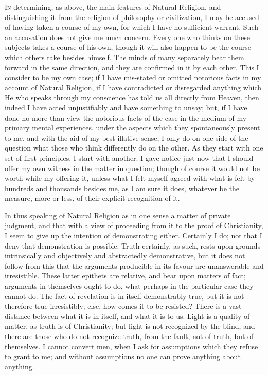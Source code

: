 I\textsc{n} determining, as above, the main features of Natural
Religion, and distinguishing it from the religion of philosophy or
civilization, I may be accused of having taken a course of my own, for
which I have no sufficient warrant. Such an accusation does not give
me much concern. Every one who thinks on these subjects takes a course
of his own, though it will also happen to be the course which others
take besides himself. The minds of many separately bear them forward
in the same direction, and they are confirmed in it by each other.
This I consider to be my own case; if I have mis-stated or omitted
notorious facts in my account of Natural Religion, if I have
contradicted or disregarded anything which He who speaks through my
conscience has told us all directly from Heaven, then indeed I have
acted unjustifiably and have something to unsay; but, if I have done
no more than view the notorious facts of the case in the medium of my
primary mental experiences, under the aspects which they spontaneously
present to me, and with the aid of my best illative sense, I only do
on one side of the question what those who think differently do on the
other. As they start with one set of first principles, I start
with another. I gave notice just now that I should offer my own
witness in the matter in question; though of course it would not be
worth while my offering it, unless what I felt myself agreed with what
is felt by hundreds and thousands besides me, as I am sure it does,
whatever be the measure, more or less, of their explicit recognition
of it.

In thus speaking of Natural Religion as in one sense a matter of
private judgment, and that with a view of proceeding from it to the
proof of Christianity, I seem to give up the intention of
demonstrating either. Certainly I do; not that I deny that
demonstration is possible. Truth certainly, as such, rests upon
grounds intrinsically and objectively and abstractedly demonstrative,
but it does not follow from this that the arguments producible in its
favour are unanswerable and irresistible. These latter epithets are
relative, and bear upon matters of fact; arguments in themselves ought
to do, what perhaps in the particular case they cannot do. The fact of
revelation is in itself demonstrably true, but it is not therefore
true irresistibly; else, how comes it to be resisted? There is a vast
distance between what it is in itself, and what it is to us. Light is
a quality of matter, as truth is of Christianity; but light is not
recognized by the blind, and there are those who do not recognize
truth, from the fault, not of truth, but of themselves. I cannot
convert men, when I ask for assumptions which they refuse to grant to
me; and without assumptions no one can prove anything about anything.

